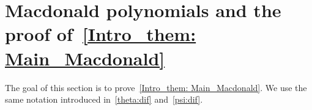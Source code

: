 \documentclass[12pt,a4paper,reqno]{amsart}
\theoremstyle{plain}
\newtheorem{lemma}[theorem]{Lemma}
\newtheorem{proposition}[theorem]{Proposition}
\theoremstyle{definition}
\newcommand{\less}{\unlhd}
\newcommand{\1}{\mathds{1}}
\begin{document}
\section{Macdonald polynomials and the proof of~\cref{Intro_them: Main_Macdonald}
}
The goal of this section is to prove~\cref{Intro_them: Main_Macdonald}. We use the same notation introduced in~\cref{theta:dif} and~\cref{psi:dif}.
\end{document}
